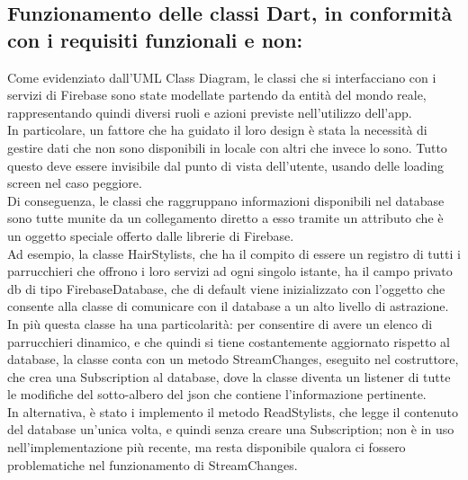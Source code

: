 \documentclass{article}
\begin{document}
\subsection{Funzionamento delle classi Dart, in conformità con i requisiti funzionali e non:}
Come evidenziato dall’UML Class Diagram, le classi che si interfacciano con i servizi di Firebase sono state modellate partendo da entità del mondo reale, rappresentando quindi diversi ruoli e azioni previste nell’utilizzo dell’app. 
\\In particolare, un fattore che ha guidato il loro design è stata la necessità di gestire dati che non sono disponibili in locale con altri che invece lo sono. Tutto questo deve essere invisibile dal punto di vista dell’utente, usando delle loading screen nel caso peggiore. 
\\Di conseguenza, le classi che raggruppano informazioni disponibili nel database sono tutte munite da un collegamento diretto a esso tramite un attributo che è un oggetto speciale offerto dalle librerie di Firebase.
\\Ad esempio, la classe HairStylists, che ha il compito di essere un registro di tutti i parrucchieri che offrono i loro servizi ad ogni singolo istante, ha il campo privato db di tipo FirebaseDatabase, che di default viene inizializzato con l’oggetto che consente alla classe di comunicare con il database a un alto livello di astrazione. In più questa classe ha una particolarità: per consentire di avere un elenco di parrucchieri dinamico, e che quindi si tiene costantemente aggiornato rispetto al database, la classe conta con un metodo StreamChanges, eseguito nel costruttore, che crea una Subscription al database, dove la classe diventa un listener di tutte le modifiche del sotto-albero del json che contiene l’informazione pertinente.
\\In alternativa, è stato i implemento il metodo ReadStylists, che legge il contenuto del database un’unica volta, e quindi senza creare una Subscription; non è in uso nell’implementazione più recente, ma resta disponibile qualora ci fossero problematiche nel funzionamento di StreamChanges. 
\end{document}
